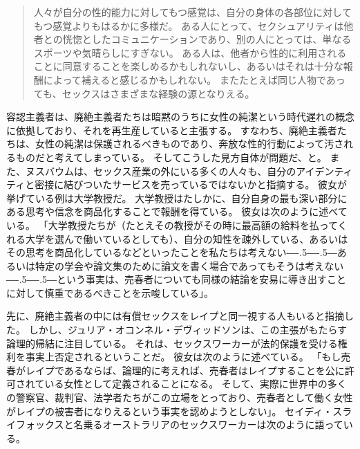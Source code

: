\documentclass[paper=a4,book,openany]{jlreq}
\def\DDASH{―\kern-.5\zw―\kern-.5\zw―} %
\begin{document}
\begin{quote}
人々が自分の性的能力に対してもつ感覚は、自分の身体の各部位に対してもつ感覚よりもはるかに多様だ。
ある人にとって、セクシュアリティは他者との恍惚としたコミュニケーションであり、別の人にとっては、単なるスポーツや気晴らしにすぎない。
ある人は、他者から性的に利用されることに同意することを楽しめるかもしれないし、あるいはそれは十分な報酬によって補えると感じるかもしれない。
またたとえば同じ人物であっても、セックスはさまざまな経験の源となりえる。
\citep[p.71]{satz95:_market_women_sexual_labor}
\end{quote}

容認主義者は、廃絶主義者たちは暗黙のうちに女性の純潔という時代遅れの概念に依拠しており、それを再生産していると主張する。
すなわち、廃絶主義者たちは、女性の純潔は保護されるべきものであり、奔放な性的行動によって汚されるものだと考えてしまっている。
そしてこうした見方自体が問題だ、と。
また、ヌスバウムは、セックス産業の外にいる多くの人々も、自分のアイデンティティと密接に結びついたサービスを売っているではないかと指摘する。
彼女が挙げている例は大学教授だ。
大学教授はたしかに、自分自身の最も深い部分にある思考や信念を商品化することで報酬を得ている。
彼女は次のように述べている。
「大学教授たちが（たとえその教授がその時に最高額の給料を払ってくれる大学を選んで働いているとしても）、自分の知性を疎外している、あるいはその思考を商品化しているなどといったことを私たちは考えない{\DDASH}あるいは特定の学会や論文集のために論文を書く場合であってもそうは考えない{\DDASH}という事実は、売春者についても同様の結論を安易に導き出すことに対して慎重であるべきことを示唆している」\citep[p.704]{nussbaum98:_wheth_reason_prejud}。

先に、廃絶主義者の中には有償セックスをレイプと同一視する人もいると指摘した。
しかし、ジュリア・オコンネル・デヴィッドソンは、この主張がもたらす論理的帰結に注目している。
それは、セックスワーカーが法的保護を受ける権利を事実上否定されるということだ。
彼女は次のように述べている。
「もし売春がレイプであるならば、論理的に考えれば、売春者はレイプすることを公に許可されている女性として定義されることになる。
そして、実際に世界中の多くの警察官、裁判官、法学者たちがこの立場をとっており、売春者として働く女性がレイプの被害者になりえるという事実を認めようとしない」\citep[p.122]{davidson98:_prost_power_freed}。
セイディ・スライフォックスと名乗るオーストラリアのセックスワーカーは次のように語っている。
\end{document}
